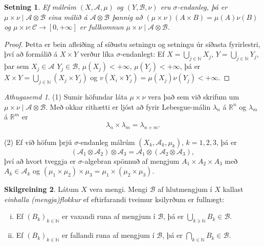 \documentclass[a4paper,icelandic,11pt]{book}
\theoremstyle{plain}      \newtheorem{setn}{Setning}[chapter]
\theoremstyle{definition} \newtheorem{skilgr}[setn]{Skilgreining}
\theoremstyle{remark}     \newtheorem*{ath}{Athugasemd}
\newcommand{\R}{\mathbb R}
\newcommand{\N}{\mathbb N}
\begin{document}
\begin{setn}
  Ef málrúm $(X,\mathcal A,\mu)$ og $(Y,\mathcal B,\nu)$ eru
  $\sigma$-endanleg, þá er $\mu\times\nu\mid \mathcal A\otimes
  \mathcal B$ \emph{eina} málið á $\mathcal A\otimes\mathcal B$ þannig
  að $(\mu\times\nu)(A\times B)=\mu(A)\nu(B)$ og
  $\mu\times\nu:\mathcal C\to[0,+\infty]$ er fullkomnun
  $\mu\times\nu\mid\mathcal A\otimes\mathcal B$.
\end{setn}
\begin{proof}
  Þetta er bein afleiðing af síðustu setningu og setningu úr síðasta
  fyrirlestri, því að formálið á $X\times Y$ verður líka
  $\sigma$-endanlegt: Ef $X=\bigcup_{j\in\N} X_{j}$,
  $Y=\bigcup_{j\in\N}Y_{j}$, þar sem $X_{j}\in\mathcal A$
  $Y_{j}\in\mathcal B$, $\mu(X_{j})<+\infty$, $\mu(Y_{j})<+\infty$, þá
  er $X\times Y = \bigcup_{j\in\N}(X_{j}\times Y_{j})$ og
  $v(X_{i}\times Y_{j})=\mu(X_{j})\nu(Y_{j})<+\infty$.
\end{proof}
\begin{ath}
  (1) Sumir höfundar láta $\mu\times\nu$ vera það sem við skrifum um
  $\mu\times\nu\mid\mathcal A\otimes\mathcal B$. Með okkar rithætti er
  ljóst að fyrir Lebesgue-málin $\lambda_{n}$ á $\R^{n}$ og
  $\lambda_{m}$ á $\R^{m}$ er
  \[
  \lambda_{n}\times\lambda_{m} = \lambda_{n+m}.
  \]

  (2) Ef við höfum þrjú $\sigma$-endanleg málrúm $(X_{k},\mathcal
  A_{k},\mu_{k})$, $k=1,2,3$, þá er 
  \[
  (\mathcal A_{1}\otimes\mathcal A_{2})\otimes\mathcal A_{3}
  = \mathcal A_{1}\otimes(\mathcal A_{2}\otimes\mathcal A_{3}),
  \]
  því að hvort tveggja er $\sigma$-algebran spönnuð af mengjum
  $A_{1}\times A_{2}\times A_{3}$ með $A_{k}\in\mathcal A_{k}$ og
  $(\mu_{1}\times\mu_{2})\times\mu_{3} =
  \mu_{1}\times(\mu_{2}\times\mu_{3})$.
\end{ath}
\begin{skilgr}
  Látum $X$ vera mengi. Mengi $\mathcal B$ af hlutmengjum í $X$
  kallast \emph{einhalla (mengja)flokkur} ef eftirfarandi tveimur ksilyrðum er fullnægt:
  \begin{enumerate}[(i)]
  \item Ef $(B_{k})_{k\in\N}$ er vaxandi runa af mengjum í $\mathcal
    B$, þá er $\bigcup_{k\ni\N}B_{k}\in\mathcal B$.
  \item Ef $(B_{k})_{k\in\N}$ er fallandi runa af mengjum í $\mathcal
    B$, þá er $\bigcap_{k\in\N}B_{k}\in\mathcal B$.
  \end{enumerate}
\end{skilgr}
\end{document}
